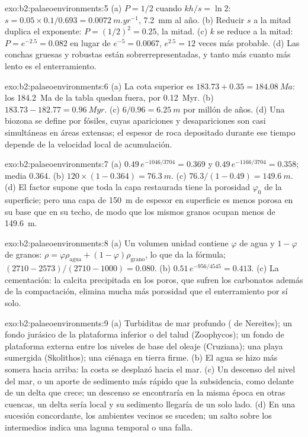 \begin{solution}{exo:b2:palaeoenvironments:5}
(a) $P = 1/2$ cuando $kh/s = \ln 2$: $s = 0.05 \times 0.1/0.693 = \qty{0.0072}{m.yr^{-1}}$,
\qty{7.2}{mm} al año. (b) Reducir $s$ a la mitad duplica el exponente: $P = (1/2)^2 = 0.25$, la mitad.
(c) $k$ se reduce a la mitad: $P = e^{-2.5} = 0.082$ en lugar de $e^{-5} = 0.0067$, $e^{2.5} = 12$ veces más
probable. (d) Las conchas gruesas y robustas están sobrerrepresentadas, y tanto más cuanto más lento es el enterramiento.
\end{solution}

\begin{solution}{exo:b2:palaeoenvironments:6}
(a) La cota superior es $183.73 + 0.35 = \qty{184.08}{Ma}$: los \qty{184.2}{Ma} de la tabla quedan
fuera, por \qty{0.12}{Myr}. (b) $183.73 - 182.77 = \qty{0.96}{Myr}$. (c) $6/0.96 =
\qty{6.25}{m}$ por millón de años. (d) Una biozona se define por fósiles, cuyas apariciones y
desapariciones son casi simultáneas en áreas extensas; el espesor de roca depositado durante
ese tiempo depende de la velocidad local de acumulación.
\end{solution}

\begin{solution}{exo:b2:palaeoenvironments:7}
(a) $0.49\,e^{-1046/3704} = 0.369$ y $0.49\,e^{-1166/3704} = 0.358$; media $0.364$. (b) $120
\times (1 - 0.364) = \qty{76.3}{m}$. (c) $76.3/(1 - 0.49) = \qty{149.6}{m}$. (d) El factor
supone que toda la capa restaurada tiene la porosidad $\varphi_0$ de la superficie; pero una capa
de \qty{150}{m} de espesor en superficie es menos porosa en su base que en su techo, de modo que los mismos granos
ocupan menos de \qty{149.6}{m}.
\end{solution}

\begin{solution}{exo:b2:palaeoenvironments:8}
(a) Un volumen unidad contiene $\varphi$ de agua y $1 - \varphi$ de granos: $\rho = \varphi
\rho_{\text{agua}} + (1 - \varphi)\rho_{\text{grano}}$, lo que da la fórmula; $(2710 -
2573)/(2710 - 1000) = 0.080$. (b) $0.51\,e^{-956/4545} = 0.413$. (c) La cementación: la calcita
precipitada en los poros, que sufren los carbonatos además de la compactación, elimina mucha más porosidad
que el enterramiento por sí solo.
\end{solution}

\begin{solution}{exo:b2:palaeoenvironments:9}
(a) Turbiditas de mar profundo ( de Nereites); un fondo jurásico de la plataforma inferior o del talud
(Zoophycos); un fondo de plataforma externa entre los niveles de base del oleaje (Cruziana); una playa sumergida (Skolithos); una
ciénaga en tierra firme. (b) El agua se hizo más somera hacia arriba: la costa se desplazó hacia el mar. (c) Un descenso del nivel del mar,
o un aporte de sedimento más rápido que la subsidencia, como delante de un delta que crece; un descenso
se encontraría en la misma época en otras cuencas, un delta sería local y su sedimento llegaría
de un solo lado. (d) En una sucesión concordante, los ambientes vecinos se suceden; un
salto sobre los intermedios indica una laguna temporal o una falla.
\end{solution}


